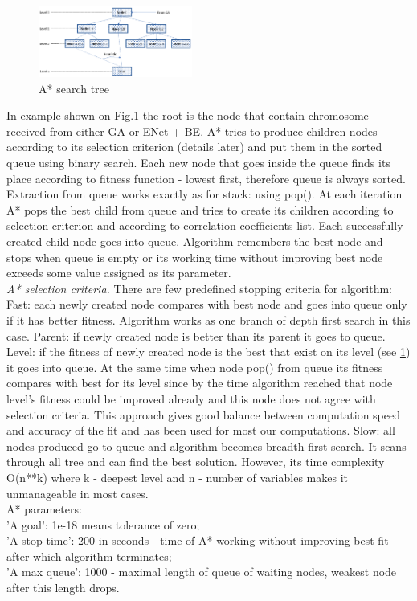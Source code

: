 \documentclass[aps,prl,reprint,amsmath,amssymb,nature]{revtex4-1}
\begin{document}
\begin{figure}
\includegraphics[width=0.45\textwidth]{media/water_distances_3.eps}
\caption{A* search tree}\label{Fig:A_star_tree}
\end{figure}

In example shown on Fig.\ref{Fig:A_star_tree} the root is the node that contain chromosome received from either GA or ENet + BE. A* tries to produce children nodes according to its selection criterion (details later) and put them in the sorted queue using binary search. Each new node that goes inside the queue finds its place according to fitness function - lowest first, therefore queue is always sorted. Extraction from queue works exactly as for stack: using pop(). At each iteration A* pops the best child from queue and tries to create its children according to selection criterion and according to correlation coefficients list. Each successfully created child node goes into queue. Algorithm remembers the best node and stops when queue is empty or its working time without improving best node exceeds some value assigned as its parameter.\\
\textit{A* selection criteria.} There are few predefined stopping criteria for algorithm:
Fast: each newly created node compares with best node and goes into queue only if it has better fitness. Algorithm works as one branch of depth first search in this case.
Parent: if newly created node is better than its parent it goes to queue.
Level: if the fitness of newly created node is the best that exist on its level (see \ref{Fig:A_star_tree}) it goes into queue. At the same time when node pop() from queue its fitness compares with best for its level since by the time algorithm reached that node level's fitness could be improved already and this node does not agree with selection criteria. This approach gives good balance between computation speed and accuracy of the fit and has been used for most our computations.
Slow: all nodes produced go to queue and algorithm becomes breadth first search. It scans through all tree and can find the best solution. However, its time complexity O(n**k) where k - deepest level and n - number of variables makes it unmanageable in most cases. \\
A* parameters:\\
'A goal': 1e-18 means tolerance of zero; \\
'A stop time': 200 in seconds - time of A* working without improving best fit after which algorithm terminates;\\
'A max queue': 1000 - maximal length of queue of waiting nodes, weakest node after this length drops.\\
            
\end{document}
